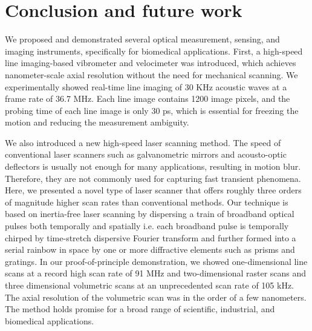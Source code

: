 \chapter{Conclusion and future work}
\label{chp:CONCLU_Chapter}

We proposed and demonstrated several optical measurement, sensing, and imaging instruments, specifically for biomedical applications. First, a high-speed line imaging-based vibrometer and velocimeter was introduced, which achieves nanometer-scale axial resolution without the need for mechanical scanning. We experimentally showed real-time line imaging of 30 KHz acoustic waves at a frame rate of 36.7 MHz. Each line image contains 1200 image pixels, and the probing time of each line image is only 30 ps, which is essential for freezing the motion and reducing the measurement ambiguity.

We also introduced a new high-speed laser scanning method. The speed of conventional laser scanners such as galvanometric mirrors and acousto-optic deflectors is usually not enough for many applications, resulting in motion blur. Therefore, they are not commonly used for capturing fast transient phenomena. Here, we presented a novel type of laser scanner that offers roughly three orders of magnitude higher scan rates than conventional methods. Our technique is based on inertia-free laser scanning by dispersing a train of broadband optical pulses both temporally and spatially i.e. each broadband pulse is temporally chirped by time-stretch dispersive Fourier transform and further formed into a serial rainbow in space by one or more diffractive elements such as prisms and gratings. In our proof-of-principle demonstration, we showed one-dimensional line scans at a record high scan rate of 91 MHz and two-dimensional raster scans and three dimensional volumetric scans at an unprecedented scan rate of 105 kHz. The axial resolution of the volumetric scan was in the order of a few nanometers. The method holds promise for a broad range of scientific, industrial, and biomedical applications.

